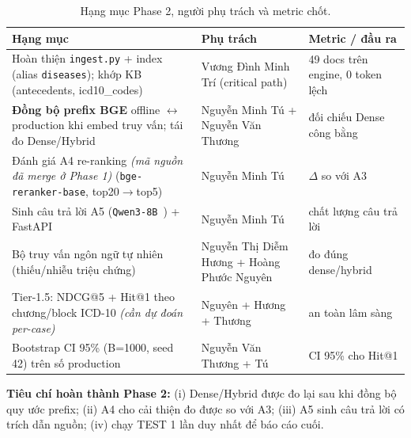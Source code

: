 \begin{table}[H]
    \centering
    \small
    \caption{Hạng mục Phase 2, người phụ trách và metric chốt.}
    \label{tab:phase2}
    \begin{tabular}{p{4.3cm}p{4.0cm}p{3.4cm}}
        \hline
        \textbf{Hạng mục}                                                                                                  & \textbf{Phụ trách}                         & \textbf{Metric / đầu ra}          \\
        \hline
        Hoàn thiện \texttt{ingest.py} + index (alias \texttt{diseases}); khớp KB (antecedents, icd10\_codes)               & Vương Đình Minh Trí (critical path)        & 49 docs trên engine, 0 token lệch \\
        \textbf{Đồng bộ prefix BGE} offline $\leftrightarrow$ production khi embed truy vấn; tái đo Dense/Hybrid           & Nguyễn Minh Tú + Nguyễn Văn Thương         & đối chiếu Dense công bằng         \\
        Đánh giá A4 re-ranking \textit{(mã nguồn đã merge ở Phase 1)} (\texttt{bge-reranker-base}, top20$\rightarrow$top5) & Nguyễn Minh Tú                             & $\Delta$ so với A3                \\
        Sinh câu trả lời A5 (\texttt{Qwen3-8B}~\cite{qwen2025qwen3}) + FastAPI                                             & Nguyễn Minh Tú                             & chất lượng câu trả lời            \\
        Bộ truy vấn ngôn ngữ tự nhiên (thiếu/nhiễu triệu chứng)                                                            & Nguyễn Thị Diễm Hương + Hoàng Phước Nguyên & đo đúng dense/hybrid              \\
        Tier-1.5: NDCG@5 + Hit@1 theo chương/block ICD-10 \textit{(cần dự đoán per-case)}                                  & Nguyên + Hương + Thương                    & an toàn lâm sàng                  \\
        Bootstrap CI 95\% (B=1000, seed 42) trên số production                                                             & Nguyễn Văn Thương + Tú                     & CI 95\% cho Hit@1                 \\
        \hline
    \end{tabular}
\end{table}

\textbf{Tiêu chí hoàn thành Phase 2:} (i) Dense/Hybrid được đo lại sau khi đồng bộ quy ước prefix; (ii) A4 cho cải thiện đo được so với A3; (iii) A5 sinh câu trả lời có trích dẫn nguồn; (iv) chạy TEST 1 lần duy nhất để báo cáo cuối.
